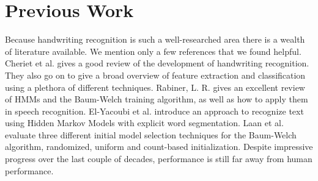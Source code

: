 \section{Previous Work}
Because handwriting recognition is such a well-researched area there is a wealth of literature available.%
We mention only a few references that we found helpful.
Cheriet et al. \cite{Cheriet} gives a good review of the development of handwriting recognition.
They also go on to give a broad overview of feature extraction and classification using a plethora of different techniques.
Rabiner, L. R. \cite{Rabiner1989} gives an excellent review of HMMs and the Baum-Welch training algorithm, as well as how to apply them in speech recognition.
El-Yacoubi et al. \cite{intro-Yacoubi} introduce an approach to recognize text using Hidden Markov Models with explicit word segmentation.
Laan et al. \cite{initialmodel} evaluate three different initial model selection techniques for the Baum-Welch algorithm, randomized, uniform and count-based initialization.
Despite impressive progress over the last couple of decades, performance is still far away from human performance.


